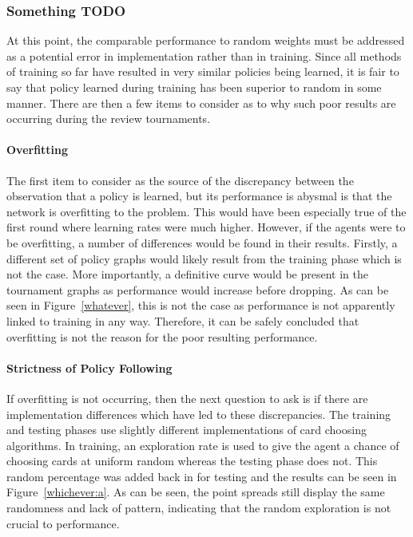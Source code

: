 
\subsubsection{Something TODO}
\label{sec:findings-r2-length}

At this point,
the comparable performance to random weights must be addressed as a potential
error in implementation rather than in training.
%
Since all methods of training so far have resulted in very similar policies
being learned,
it is fair to say that policy learned during training has been superior to
random in some manner.
%
There are then a few items to consider as to why such poor results are occurring
during the review tournaments.


\paragraph{Overfitting}

The first item to consider as the source of the discrepancy between the
observation that a policy is learned,
but its performance is abysmal
is that the network is overfitting to the problem.
%
This would have been especially true of the first round where learning rates
were much higher.
%
However,
if the agents were to be overfitting,
a number of differences would be found in their results.
%
Firstly,
a different set of policy graphs would likely result from the training phase
which is not the case. %
%
More importantly,
a definitive curve would be present in the tournament graphs as performance
would increase before dropping.
%
As can be seen in Figure~\ref{whatever},
this is not the case
as performance is not apparently linked to training in any way.
%
Therefore, it can be safely concluded that overfitting is not the reason
for the poor resulting performance.

\paragraph{Strictness of Policy Following}

If overfitting is not occurring,
then the next question to ask is if there are implementation differences which
have led to these discrepancies.
%
The training and testing phases use slightly different implementations of 
card choosing algorithms.
%
In training,
an exploration rate is used to give the agent a chance of choosing cards at
uniform random
whereas the testing phase does not.
%
This random percentage was added back in for testing and the results can be seen
in Figure~\ref{whichever:a}.
%
As can be seen,
the point spreads still display the same randomness and lack of pattern,
indicating that the random exploration is not crucial to performance.

